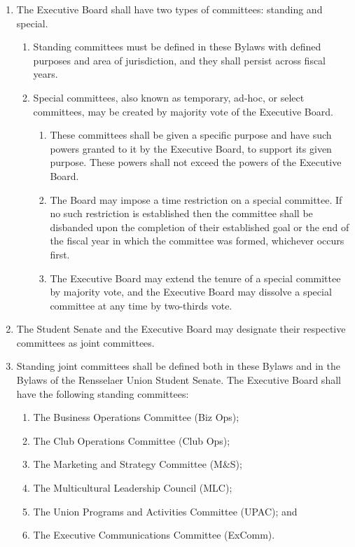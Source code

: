 \begin{enumerate}
\item The Executive Board shall have two types of committees: standing and special.
  \begin{enumerate}
  \item Standing committees must be defined in these Bylaws with defined purposes and area of jurisdiction, and they shall persist across fiscal years.
  \item Special committees, also known as temporary, ad-hoc, or select committees, may be created by majority vote of the Executive Board.
    \begin{enumerate}
    \item These committees shall be given a specific purpose and have such powers granted to it by the Executive Board, to support its given purpose. These powers shall not exceed the powers of the Executive Board.
    \item The Board may impose a time restriction on a special committee. If no such restriction is established then the committee shall be disbanded upon the completion of their established goal or the end of the fiscal year in which the committee was formed, whichever occurs first.
    \item The Executive Board may extend the tenure of a special committee by majority vote, and the Executive Board may dissolve a special committee at any time by two-thirds vote.
    \end{enumerate}
  \end{enumerate}
\item The Student Senate and the Executive Board may designate their respective committees as joint committees.
\item Standing joint committees shall be defined both in these Bylaws and in the Bylaws of the Rensselaer Union Student Senate. The Executive Board shall have the following standing committees:
  \begin{enumerate}
  \item The Business Operations Committee (Biz Ops);
  \item The Club Operations Committee (Club Ops);
  \item The Marketing and Strategy Committee (M\&S);
  \item The Multicultural Leadership Council (MLC);
  \item The Union Programs and Activities Committee (UPAC); and
  \item The Executive Communications Committee (ExComm).

\end{enumerate}
\end{enumerate}
